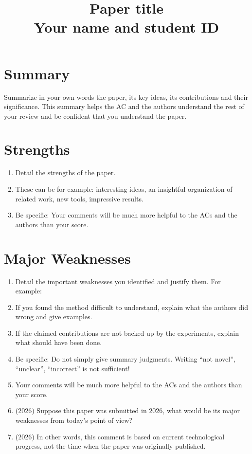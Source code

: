 \documentclass[10pt,twocolumn,letterpaper]{article}
\begin{document}
\title{Paper title \\ Your name and student ID}  %

\maketitle
\thispagestyle{empty}
\appendix

\section{Summary}
Summarize in your own words the paper, its key ideas, its contributions and their significance. This summary helps the AC and the authors understand the rest of your review and be confident that you understand the paper.

\section{Strengths}
\begin{enumerate}
    \item Detail the strengths of the paper.
    \item These can be for example: interesting ideas, an insightful organization of related work, new tools, impressive results.
    \item Be specific: Your comments will be much more helpful to the ACs and the authors than your score.
\end{enumerate}

\section{Major Weaknesses}
\begin{enumerate}
    \item Detail the important weaknesses you identified and justify them. For example:
    \item If you found the method difficult to understand, explain what the authors did wrong and give examples.
    \item If the claimed contributions are not backed up by the experiments, explain what should have been done.
    \item Be specific: Do not simply give summary judgments. Writing “not novel”, “unclear”, “incorrect” is not sufficient!
    \item Your comments will be much more helpful to the ACs and the authors than your score.
    \item (2026) Suppose this paper was submitted in 2026, what would be its major weaknesses from today’s point of view?
    \item (2026) In other words, this comment is based on current technological progress, not the time when the paper was originally published.
\end{enumerate}
\end{document}
